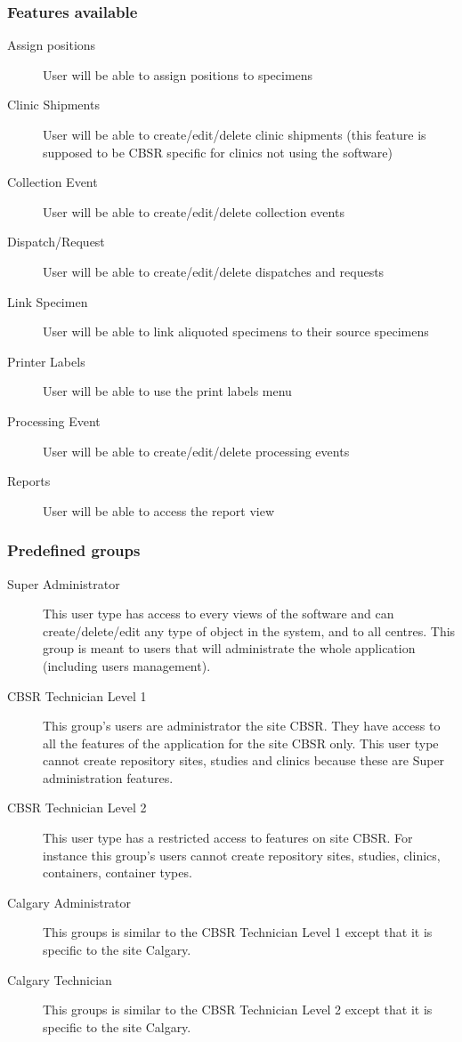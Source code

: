 \subsubsection{Features available}
\begin{description}
\item[Assign positions] User will be able to assign positions to specimens
\item[Clinic Shipments] User will be able to create/edit/delete clinic shipments (this feature is supposed to be CBSR specific for clinics not using the software)
\item[Collection Event] User will be able to create/edit/delete collection events
\item[Dispatch/Request] User will be able to create/edit/delete dispatches and requests
\item[Link Specimen] User will be able to link aliquoted specimens to their source specimens
\item[Printer Labels] User will be able to use the print labels menu
\item[Processing Event] User will be able to create/edit/delete processing events
\item[Reports] User will be able to access the report view
\end{description}

\subsubsection{Predefined groups}
\label{predefined_groups}
\begin{description}
\item[Super Administrator] This user type has access to every views of the software 
  and can create/delete/edit any type of object in the system, and to all centres. 
  This group is meant to users that will administrate the whole application (including users management).
\item[CBSR Technician Level 1] This group's users are administrator the site CBSR. They have access to all the features of the application for the site CBSR only. This user type cannot create repository sites, studies and clinics because these are Super administration features.
\item[CBSR Technician Level 2] This user type has a restricted access to features on site CBSR.
  For instance this group's users cannot create repository sites, studies, clinics, containers, 
  container types.
\item[Calgary Administrator] This groups is similar to the CBSR Technician Level 1 except that it is specific to the site Calgary.
\item[Calgary Technician] This groups is similar to the CBSR Technician Level 2 except that it is specific to the site Calgary.
\end{description}

